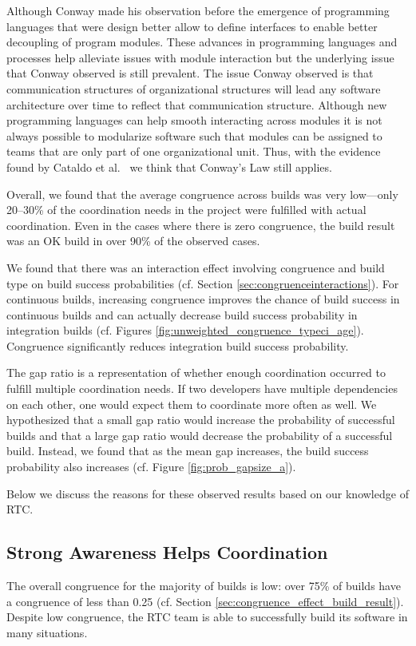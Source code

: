 Although Conway made his observation before the emergence of programming languages that were design better allow to define interfaces to enable better decoupling of program modules.
These advances in programming languages and processes help alleviate issues with module interaction but the underlying issue that Conway observed is still prevalent.
The issue Conway observed is that communication structures of organizational structures will lead any software architecture over time to reflect that communication structure.
Although new programming languages can help smooth interacting across modules it is not always possible to modularize software such that modules can be assigned to teams that are only part of one organizational unit.
Thus, with the evidence found by Cataldo et al.~\cite{cataldo:cscw:2006} we think that Conway's Law still applies.

Overall, we found that the average congruence across builds was very low---only 20--30\% of the coordination needs in the project were fulfilled with actual coordination. Even in the cases where there is zero congruence, the build result was an OK build in over 90\% of the observed cases.

We found that there was an interaction effect involving congruence and build type on build success probabilities (cf. Section \ref{sec:congruenceinteractions}). For continuous builds, increasing congruence improves the chance of build success in continuous builds and can actually decrease build success probability in integration builds (cf. Figures \ref{fig:unweighted_congruence_typeci_age}). Congruence significantly reduces integration build success probability.

The gap ratio is a representation of whether enough coordination
occurred to fulfill multiple coordination needs. If two developers have multiple dependencies on each other, one would expect them to
coordinate more often as well.
We hypothesized that a small gap ratio would increase the probability of successful builds and that a large gap ratio would decrease the probability of a successful build. Instead, we found that as the mean gap increases, the build success probability also increases (cf. Figure \ref{fig:prob_gapsize_a}).

Below we discuss the reasons for these observed results based on our knowledge of RTC.

\subsection{Strong Awareness Helps Coordination}
The overall congruence for the majority of builds is low: over 75\% of
builds have a congruence of less than 0.25 (cf. Section \ref{sec:congruence_effect_build_result}).
Despite low congruence, the RTC team is able to successfully build its software in many situations.



